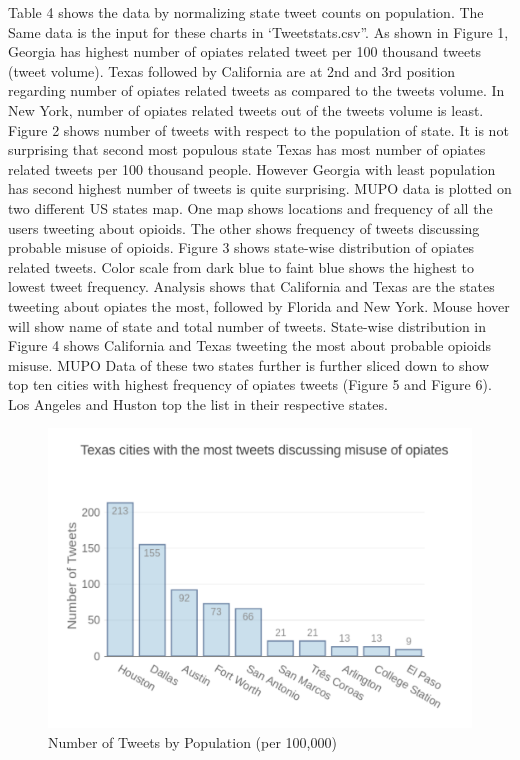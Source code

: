 \documentclass[sigconf]{acmart}
\begin{document}
Table 4 shows the data by normalizing state tweet counts on population. 
The Same data is the input for these charts in ‘Tweetstats.csv”. As shown in Figure 1, Georgia has highest number of opiates related tweet per 100 thousand tweets (tweet volume). Texas followed by California are at 2nd and 3rd position regarding number of opiates related tweets as compared to the tweets volume. In New York, number of opiates related tweets out of the tweets volume is least. 
Figure 2 shows number of tweets with respect to the population of state. It is not surprising that second most populous state Texas has most number of opiates related tweets per 100 thousand people. However Georgia with least population has second highest number of tweets is quite surprising.
MUPO data is plotted on two different US states map. One map shows locations and frequency of all the users tweeting about opioids. The other shows frequency of tweets discussing probable misuse of opioids. 
Figure 3 shows state-wise distribution of opiates related tweets. Color scale from dark blue to faint blue shows the highest to lowest tweet frequency. Analysis shows that California and Texas are the states tweeting about opiates the most, followed by Florida and New York. Mouse hover will show name of state and total number of tweets.
State-wise distribution in Figure 4 shows California and Texas tweeting the most about probable opioids misuse. MUPO Data of these two states further is further sliced down to show top ten cities with highest frequency of opiates tweets (Figure 5 and Figure 6). Los Angeles and Huston top the list in their respective states. 





\begin{figure}[!ht]
  \centering\includegraphics[width=\columnwidth]{images/Figure1.pdf}
  \caption{Number of Tweets by Population (per 100,000)}
  \label{f:Figure1}
\end{figure}
\end{document}
